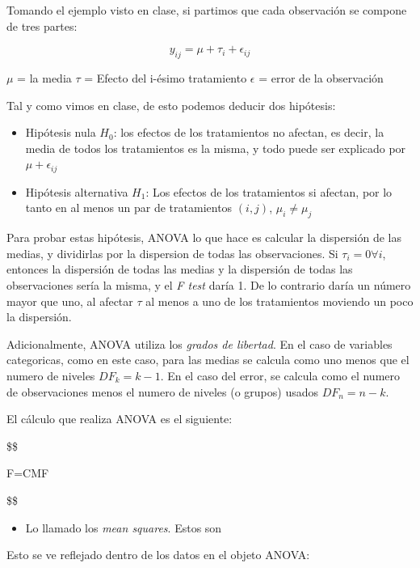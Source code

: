 \documentclass[]{article}
\providecommand{\tightlist}{%
  \setlength{\itemsep}{0pt}\setlength{\parskip}{0pt}}
\begin{document}
Tomando el ejemplo visto en clase, si partimos que cada observación se
compone de tres partes:

\[ y_{ij} = \mu + \tau_i + \epsilon_{ij} \]

\(\mu\) = la media \(\tau\) = Efecto del i-ésimo tratamiento
\(\epsilon\) = error de la observación

Tal y como vimos en clase, de esto podemos deducir dos hipótesis:

\begin{itemize}
\tightlist
\item
  Hipótesis nula \(H_0\): los efectos de los tratamientos no afectan, es
  decir, la media de todos los tratamientos es la misma, y todo puede
  ser explicado por \(\mu + \epsilon_{ij}\)
\item
  Hipótesis alternativa \(H_1\): Los efectos de los tratamientos si
  afectan, por lo tanto en al menos un par de tratamientos \((i,j)\),
  \(\mu_i \neq \mu_j\)
\end{itemize}

Para probar estas hipótesis, ANOVA lo que hace es calcular la dispersión
de las medias, y dividirlas por la dispersion de todas las
observaciones. Si \(\tau_i=0 \forall i\), entonces la dispersión de
todas las medias y la dispersión de todas las observaciones sería la
misma, y el \emph{F test} daría 1. De lo contrario daría un número mayor
que uno, al afectar \(\tau\) al menos a uno de los tratamientos moviendo
un poco la dispersión.

Adicionalmente, ANOVA utiliza los \emph{grados de libertad}. En el caso
de variables categoricas, como en este caso, para las medias se calcula
como uno menos que el numero de niveles \(DF_k=k-1\). En el caso del
error, se calcula como el numero de observaciones menos el numero de
niveles (o grupos) usados \(DF_n=n-k\).

El cálculo que realiza ANOVA es el siguiente:

\$\$

F=CMF

\$\$

\begin{itemize}
\tightlist
\item
  Lo llamado los \emph{mean squares}. Estos son
\end{itemize}

Esto se ve reflejado dentro de los datos en el objeto ANOVA:
\end{document}
